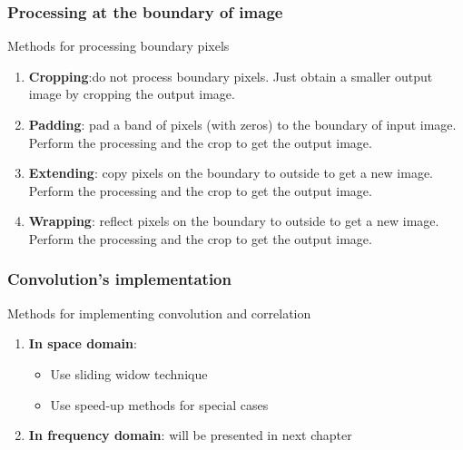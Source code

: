 \documentclass[english,11pt,table,handout]{beamer}
\begin{document}
\frame
{
	\frametitle{Processing at the boundary of image}
	
	\begin{block}{Methods for processing boundary pixels}
		\begin{enumerate}
			\item \textbf{Cropping}:do not process boundary pixels. Just obtain a smaller output image by cropping the output image.
			\item \textbf{Padding}: pad a band of pixels (with zeros) to the boundary of input image. Perform the processing and the crop to get the output image.
			\item \textbf{Extending}: copy pixels on the boundary to outside to get a new image. Perform the processing and the crop to get the output image.
			\item \textbf{Wrapping}: reflect pixels on the boundary to outside to get a new image. Perform the processing and the crop to get the output image.
			
		\end{enumerate} 
	\end{block}
	
}

\frame
{
	\frametitle{Convolution's implementation}
	
	\begin{block}{Methods for implementing convolution and correlation}
		\begin{enumerate}
			\item \textbf{In space domain}:
				\begin{itemize}
					\item Use sliding widow technique
					\item Use speed-up methods for special cases
				\end{itemize}
			\item \textbf{In frequency domain}: will be presented in next chapter
			
		\end{enumerate} 
	\end{block}
	
}
\end{document}
